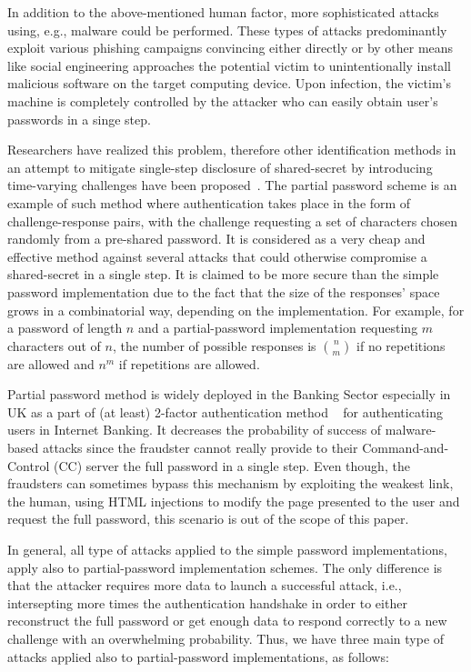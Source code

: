 \documentclass{llncs}
\begin{document}
In addition to the above-mentioned human factor, more sophisticated attacks
using, e.g., malware could be performed. These types of attacks predominantly
exploit various phishing campaigns convincing either directly or by
other means like social engineering approaches the potential victim to
unintentionally install malicious software on the target computing device. Upon infection, the victim's machine
is completely controlled by the attacker who can easily obtain user's passwords in a singe step. 

Researchers have realized this problem, therefore
other identification methods in an attempt to
mitigate single-step disclosure of shared-secret by introducing
time-varying challenges have been proposed~\cite{humanident1,humanident2}.
The partial password scheme is an example of such method where
authentication takes place in the form of challenge-response
pairs, with the challenge requesting a set of characters chosen
randomly from a pre-shared
password. It is considered as a very cheap and effective method
against several attacks that could otherwise compromise
a shared-secret in a single step. It is claimed to be more secure than 
the simple password implementation due to the fact that the size of the responses' space grows in a combinatorial way, 
depending on the implementation. For 
example, for a password of length $n$ and a partial-password implementation requesting $m$ characters out 
of $n$, the 
number of possible responses is $\binom{n}{m}$ if no repetitions are allowed and $n^m$ if repetitions are allowed.


Partial password method is widely deployed in the Banking Sector especially in UK as a part of (at least) 2-factor authentication method ~\cite{FC13paper,bankstas} for authenticating users 
in Internet Banking. It
decreases the probability of success of malware-based attacks since the fraudster cannot really provide to their 
Command-and-Control (CC) server the full password in a single step. Even though, the
fraudsters can sometimes bypass this mechanism by exploiting the weakest link, the human, using HTML injections to modify the page presented to the user and 
request the full password, this scenario is out of the scope of this paper.

In general, all type of attacks applied to the simple password implementations, 
apply also to partial-password implementation schemes. The only difference is 
that the attacker requires more data to launch a successful attack, i.e., intersepting 
more times the authentication handshake in order to either reconstruct the full password 
or get enough data to respond correctly to a new challenge with an overwhelming probability. 
Thus, we have three main type of attacks applied also to partial-password implementations, as follows:
\end{document}
